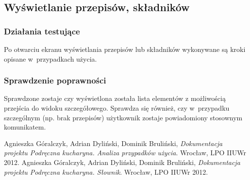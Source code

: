 \documentclass[12pt,leqno, twoside]{mwart}
\begin{document}
\subsection{Wyświetlanie przepisów, składników}
\subsubsection{Działania testujące}
\noindent Po otwarciu ekranu wyświetlania przepisów lub składników wykonywane są kroki opisane w~przypadkach użycia. 

\subsubsection{Sprawdzenie poprawności}
\noindent Sprawdzone zostaje czy wyświetlona została lista elementów z możliwością przejścia do widoku szczegółowego.
Sprawdza się również, czy w~przypadku szczególnym (np. brak przepisów) użytkownik zostaje powiadomiony stosownym
komunikatem.
\newpage
\begin{thebibliography}{9}
    Agnieszka Góralczyk, Adrian Dyliński, Dominik Bruliński, {\it Dokumentacja projektu Podręczna
      kucharyna. Analiza przypadków użycia}. Wrocław, LPO IIUWr 2012.
    Agnieszka Góralczyk, Adrian Dyliński, Dominik Bruliński, {\it Dokumentacja projektu Podręczna
      kucharyna. Słownik}. Wrocław, LPO IIUWr 2012.
\end{thebibliography}
\end{document}
